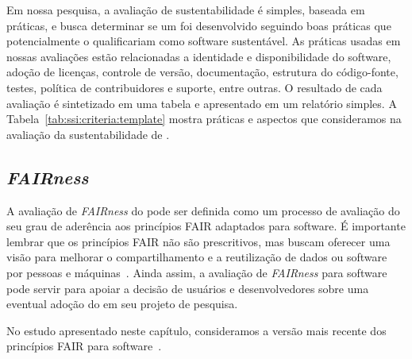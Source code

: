 
Em nossa pesquisa, a avaliação de sustentabilidade  é simples, baseada em práticas, e busca determinar se um \RSw foi desenvolvido seguindo boas práticas que potencialmente o qualificariam como software sustentável. As práticas usadas em nossas avaliações estão relacionadas a identidade e disponibilidade do software, adoção de licenças, controle de versão, documentação, estrutura do código-fonte, testes, política de contribuidores e suporte, entre outras. 
O resultado de cada avaliação é sintetizado em uma tabela
e apresentado em um relatório simples.
%
A Tabela~\ref{tab:ssi:criteria:template} mostra práticas e aspectos que consideramos na avaliação da sustentabilidade 
de \RS.


\subsection*{\textit{FAIRness}}

A avaliação de \textit{FAIRness} do \RSw pode ser definida como um processo de avaliação do seu grau de aderência aos princípios FAIR adaptados para software.
É importante lembrar que os princípios FAIR não são prescritivos, mas buscam oferecer uma visão para melhorar o compartilhamento e a reutilização de dados ou software por pessoas e máquinas~\cite{Wilkinson2016,chue_hong_fair_2022}.
%
Ainda assim, a avaliação de \textit{FAIRness} para software pode servir para apoiar a decisão de usuários e desenvolvedores sobre uma eventual adoção do \RSw em seu projeto de pesquisa.

No estudo apresentado neste capítulo, consideramos a versão mais recente dos princípios FAIR para software~\cite{barker:2022}.






%

